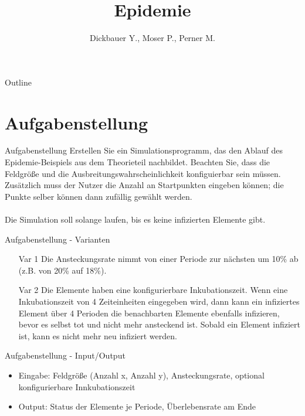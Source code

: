 

\title[BSP27 - Epidemie]{Epidemie}
\author{Dickbauer Y., Moser P., Perner M.}



\begin{frame}
  \titlepage
\end{frame}

\begin{frame}{Outline}
  \tableofcontents
\end{frame}

\section{Aufgabenstellung}
\begin{frame}{Aufgabenstellung}
Erstellen Sie ein Simulationsprogramm, das den Ablauf des Epidemie-Beispiels aus dem Theorieteil nachbildet. Beachten Sie, dass die Feldgröße und die Ausbreitungswahrscheinlichkeit konfiguierbar sein müssen. Zusätzlich muss der Nutzer die Anzahl an Startpunkten eingeben können; die Punkte selber können dann zufällig gewählt werden.
\\~\\
Die Simulation soll solange laufen, bis es keine infizierten Elemente gibt.
\end{frame}

\begin{frame}{Aufgabenstellung - Varianten}

\begin{itemize}
\item[Var 1] Die Ansteckungsrate nimmt von einer Periode zur nächsten um 10\% ab (z.B. von 20\% auf 18\%).
\vspace{.5cm}
\item[Var 2] Die Elemente haben eine konfigurierbare Inkubationszeit. Wenn eine Inkubationszeit von 4 Zeiteinheiten eingegeben wird, dann kann ein infiziertes Element über 4 Perioden die benachbarten Elemente ebenfalls infizieren, bevor es selbst tot und nicht mehr ansteckend ist. Sobald ein Element infiziert ist, kann es nicht mehr neu infiziert werden.
\end{itemize}

\end{frame}

\begin{frame}{Aufgabenstellung - Input/Output}

\begin{itemize}
  \item Eingabe: Feldgröße (Anzahl x, Anzahl y), Ansteckungsrate, optional konfigurierbare Innkubationszeit
  \vspace{1cm}
  \item Output: Status der Elemente je Periode, Überlebensrate am Ende
\end{itemize}
\end{frame}

